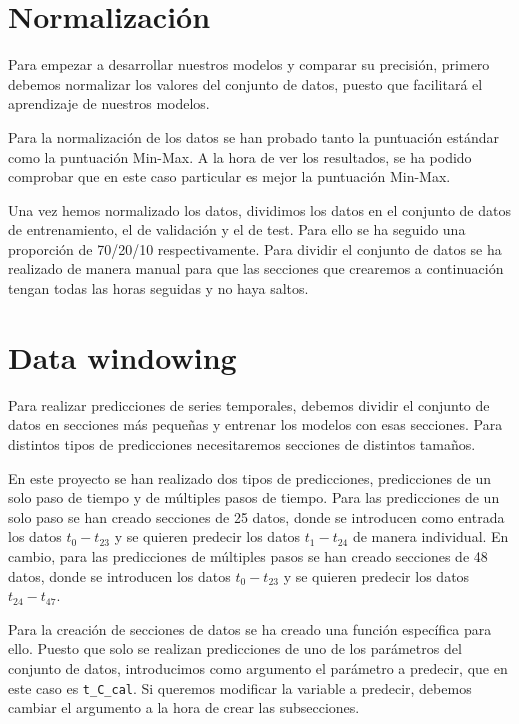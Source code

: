 \section{Normalización}

Para empezar a desarrollar nuestros modelos y comparar su precisión, primero debemos normalizar los valores del conjunto de datos, puesto que facilitará el aprendizaje de nuestros modelos.

\par

Para la normalización de los datos se han probado tanto la puntuación estándar como la puntuación Min-Max. A la hora de ver los resultados, se ha podido comprobar que en este caso particular es mejor la puntuación Min-Max.

\par

Una vez hemos normalizado los datos, dividimos los datos en el conjunto de datos de entrenamiento, el de validación y el de test. Para ello se ha seguido una proporción de 70/20/10 respectivamente. Para dividir el conjunto de datos se ha realizado de manera manual para que las secciones que crearemos a continuación tengan todas las horas seguidas y no haya saltos.

\section{Data windowing}

Para realizar predicciones de series temporales, debemos dividir el conjunto de datos en secciones más pequeñas y entrenar los modelos con esas secciones. Para distintos tipos de predicciones necesitaremos secciones de distintos tamaños.

\par

En este proyecto se han realizado dos tipos de predicciones, predicciones de un solo paso de tiempo y de múltiples pasos de tiempo. Para las predicciones de un solo paso se han creado secciones de 25 datos, donde se introducen como entrada los datos $t_0-t_{23}$ y se quieren predecir los datos $t_1-t_{24}$ de manera individual. En cambio, para las predicciones de múltiples pasos se han creado secciones de 48 datos, donde se introducen los datos $t_0-t_{23}$ y se quieren predecir los datos $t_{24}-t_{47}$.

\par

Para la creación de secciones de datos se ha creado una función específica para ello. Puesto que solo se realizan predicciones de uno de los parámetros del conjunto de datos, introducimos como argumento el parámetro a predecir, que en este caso es \texttt{t\_C\_cal}. Si queremos modificar la variable a predecir, debemos cambiar el argumento a la hora de crear las subsecciones.

